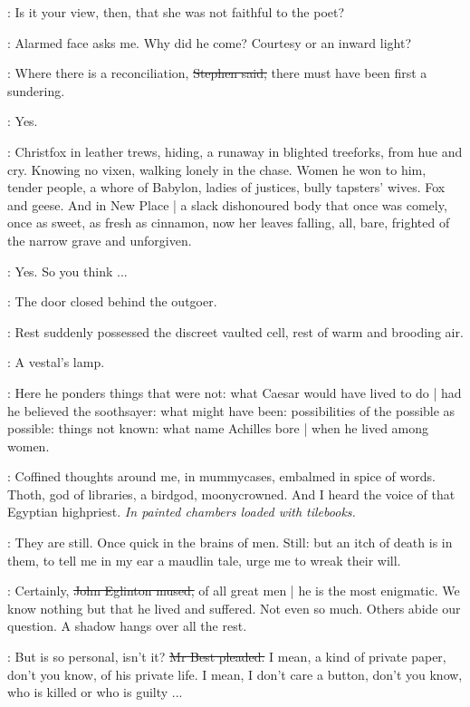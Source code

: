 \librarian:
Is it your view,
then,
that she was not faithful to the poet?

\StephenInt:
Alarmed face asks me.
Why did he come?
Courtesy or an inward light?

\Stephen:
Where there is a reconciliation,
\sout{Stephen said,}
there must have been first a sundering.

\librarian:
Yes.

\StephenInt:
Christfox in leather trews,
hiding,
a runaway in blighted tree\-forks,
from hue and cry.
Knowing no vixen,
walking lonely in the chase.
Women he won to him,
tender people,
a whore of Babylon,
ladies of justices,
bully tapsters' wives.
Fox and geese.
And in New Place |
a slack dishonoured body that once was comely,
once as sweet,
as fresh as cinnamon,
now her leaves falling,
all, bare,
frighted of the narrow grave
and unforgiven.

\librarian:
Yes.
So you think ...

:
The door closed behind the outgoer.

\StephenInt:
Rest suddenly possessed the discreet vaulted cell,
rest of warm and brooding air.

\StephenInt:
A vestal's lamp.

\StephenInt:
Here he ponders things that were not:
what Caesar would have lived to do |
had he believed the soothsayer:
what might have been:
possibilities of the possible as possible:
things not known:
what name Achilles bore |
when he lived among women.

\StephenInt:
Coffined thoughts around me,
in mummycases,
embalmed in spice of words.
Thoth,
god of libraries,
a birdgod,
moonycrowned.
And I heard the voice of that Egyptian highpriest.
\emph{In painted chambers loaded with tilebooks.}

\StephenInt:
They are still.
Once quick in the brains of men.
Still:
but an itch of death is in them,
to tell me in my ear a maudlin tale,
urge me to wreak their will.

\eglinton:
Certainly,
\sout{John Eglinton mused,}
of all great men |
he is the most enigmatic.
We know nothing but that he lived and suffered.
Not even so much.
Others abide our question.
A shadow hangs over all the rest.

\best:
But  is so personal,
isn't it?
\sout{Mr Best pleaded.}
I mean,
a kind of private paper,
don't you know,
of his private life.
I mean,
I don't care a button,
don't you know,
who is killed or who is guilty ...

